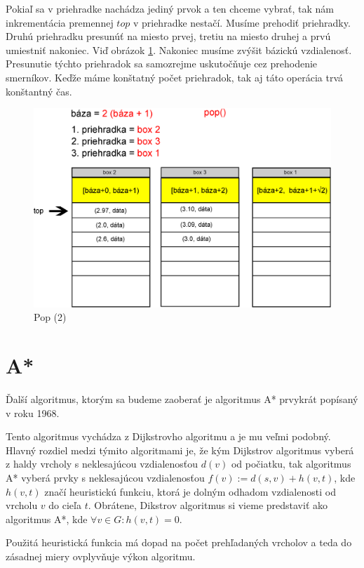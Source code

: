 Pokiaľ sa v priehradke nachádza jediný prvok a ten chceme vybrať, tak nám inkrementácia premennej $ top $ v priehradke 
nestačí. Musíme prehodiť priehradky. Druhú priehradku presunúť
na miesto prvej, tretiu na miesto druhej a prvú umiestniť nakoniec. Viď obrázok \ref{fig:priehradky_i_d2}. Nakoniec musíme zvýšit bázickú vzdialenosť. Presunutie týchto priehradok sa samozrejme uskutočňuje cez prehodenie smerníkov.
Keďže máme konštatný počet priehradok, tak aj táto operácia
trvá konštantný čas.

\begin{figure}[h]
\centering
\includegraphics[width=\textwidth]{./img/priehradky_naplnene_default_i_d2.eps}
\caption{Pop (2)}
\label{fig:priehradky_i_d2}
\end{figure}


\section{A*}
Ďalší algoritmus, ktorým sa budeme zaoberať je algoritmus
A* \cite{astar72} prvykrát popísaný v roku 1968.

Tento algoritmus vychádza z Dijkstrovho algoritmu a je mu veľmi podobný. Hlavný rozdiel medzi týmito algoritmami je, že
kým Dijkstrov algoritmus vyberá z haldy vrcholy s neklesajúcou vzdialenosťou $ d(v) $ od počiatku, tak algoritmus A* vyberá prvky s neklesajúcou vzdialenosťou $ f(v) := d(s,v) + h(v,t) $, kde $ h(v, t) $ značí heuristickú funkciu, ktorá je dolným odhadom vzdialenosti od vrcholu $ v $ do cieľa $ t $. Obrátene, Dikstrov algoritmus si vieme predstaviť ako algoritmus A*, kde $ \forall v \in G: h(v, t) = 0 $.

Použitá heuristická funkcia má dopad na počet prehľadaných vrcholov a teda do zásadnej miery ovplyvňuje výkon algoritmu.

